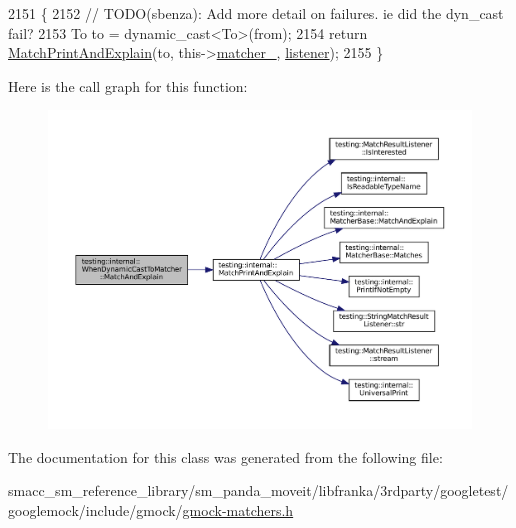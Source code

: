 \begin{DoxyCode}
2151                                                                        \{
2152     \textcolor{comment}{// TODO(sbenza): Add more detail on failures. ie did the dyn\_cast fail?}
2153     To to = \textcolor{keyword}{dynamic\_cast<}To\textcolor{keyword}{>}(from);
2154     \textcolor{keywordflow}{return} \hyperlink{namespacetesting_1_1internal_a0821df2611d54c79bac990719ad8a2dd}{MatchPrintAndExplain}(to, this->\hyperlink{classtesting_1_1internal_1_1WhenDynamicCastToMatcherBase_a40d697407c960bee8fe3b125f5ac8730}{matcher\_}, 
      \hyperlink{namespaceinteractive__marker_a0e579ab555212bb5e2c9f8a675b7618a}{listener});
2155   \}
\end{DoxyCode}
Here is the call graph for this function\+:
\nopagebreak
\begin{figure}[H]
\begin{center}
\leavevmode
\includegraphics[width=350pt]{classtesting_1_1internal_1_1WhenDynamicCastToMatcher_a270f6a1e6ad7c9b69fdefca27c513bf5_cgraph}
\end{center}
\end{figure}


The documentation for this class was generated from the following file\+:\begin{DoxyCompactItemize}
\item 
smacc\+\_\+sm\+\_\+reference\+\_\+library/sm\+\_\+panda\+\_\+moveit/libfranka/3rdparty/googletest/googlemock/include/gmock/\hyperlink{gmock-matchers_8h}{gmock-\/matchers.\+h}\end{DoxyCompactItemize}
